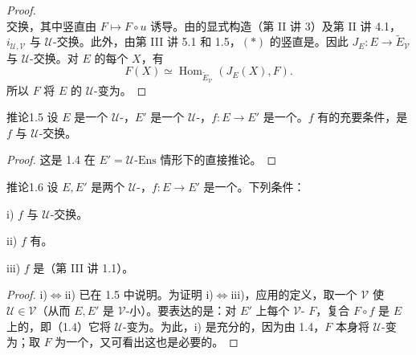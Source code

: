 \begin{proof}
\[\]
交换，其中竖直由 $F\mapsto F\circ u$ 诱导。由的显式构造（第 II 讲 3）及第 II 讲 4.1， $i_{\mathcal U,\mathcal V}$ 与 $\mathcal U$-交换。此外，由第 III 讲 5.1 和 1.5，$(*)$ 的竖直是。因此 $J_E:E\to\widetilde E_{\mathcal V}$ 与 $\mathcal U$-交换。对 $E$ 的每个 $X$，有
\[
 F(X)\simeq\operatorname{Hom}_{\widetilde E_{\mathcal V}}(J_E(X),F).
\]
所以 $F$ 将 $E$ 的 $\mathcal U$-变为。
\end{proof}
\begin{SGAresult}{推论}{1.5}
设 $E$ 是一个 $\mathcal U$-，$E'$ 是一个 $\mathcal U$-，$f:E\to E'$ 是一个。$f$ 有的充要条件，是 $f$ 与 $\mathcal U$-交换。
\end{SGAresult}
\begin{proof}
这是 1.4 在 $E'=\mathcal U\text{-}\mathrm{Ens}$ 情形下的直接推论。
\end{proof}
\begin{SGAresult}{推论}{1.6}
设 $E,E'$ 是两个 $\mathcal U$-，$f:E\to E'$ 是一个。下列条件：

 i) $f$ 与 $\mathcal U$-交换。

 ii) $f$ 有。

 iii) $f$ 是（第 III 讲 1.1）。
\end{SGAresult}
\begin{proof}
 i)$\Leftrightarrow$ii) 已在 1.5 中说明。为证明 i)$\Leftrightarrow$iii)，应用的定义，取一个 $\mathcal V$ 使 $\mathcal U\in\mathcal V$（从而 $E,E'$ 是 $\mathcal V$-小）。要表达的是：对 $E'$ 上每个 $\mathcal V$- $F$，复合 $F\circ f$ 是 $E$ 上的，即（1.4）它将 $\mathcal U$-变为。为此，i) 是充分的，因为由 1.4，$F$ 本身将 $\mathcal U$-变为；取 $F$ 为一个，又可看出这也是必要的。
\end{proof}
